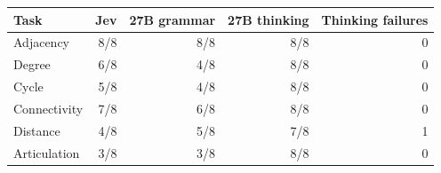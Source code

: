\begin{tabular}{lrrrr}
\toprule
Task & Jev & 27B grammar & 27B thinking & Thinking failures \\
\midrule
Adjacency & 8/8 & 8/8 & 8/8 & 0 \\
Degree & 6/8 & 4/8 & 8/8 & 0 \\
Cycle & 5/8 & 4/8 & 8/8 & 0 \\
Connectivity & 7/8 & 6/8 & 8/8 & 0 \\
Distance & 4/8 & 5/8 & 7/8 & 1 \\
Articulation & 3/8 & 3/8 & 8/8 & 0 \\
\bottomrule
\end{tabular}
